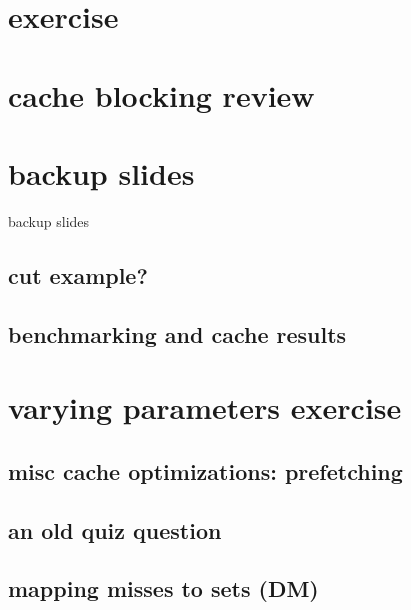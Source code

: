 \section{exercise}



\section{cache blocking review}


\section{backup slides}
\begin{frame}{backup slides}
\end{frame}

\subsection{cut example?}


\subsection{benchmarking and cache results}



\section{varying parameters exercise}


\subsection{misc cache optimizations: prefetching}


\subsection{an old quiz question}


\subsection{mapping misses to sets (DM)}

